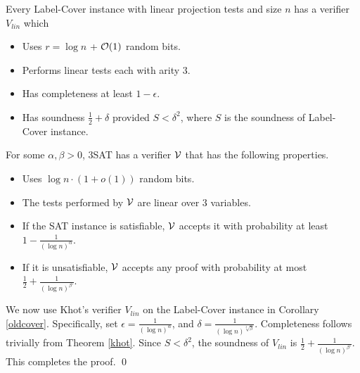 \begin{theorem} \label{khot}
Every {\sc Label-Cover} instance with linear projection tests and size $n$
has a verifier $V_{lin}$ which
\begin{itemize}

\item Uses $r = \log n$ + ${\cal O}(1)$ random bits.

\item Performs linear tests each with arity $3$.

\item Has completeness at least $1 - \epsilon$.

\item Has soundness $\frac{1}{2} + \delta$ provided $ S < \delta^2$,
  where $S$ is the soundness of {\sc Label-Cover} instance.
\end{itemize}
\end{theorem}

\begin{theorem}\label{3lin}
 For some $\alpha, \beta > 0$, {\sc 3SAT} has a verifier ${\cal V}$ that has the following properties.
\begin{itemize}
\item Uses $\log n \cdot \left(1 + o\left(1\right)\right)$ random bits.

\item The tests performed by ${\cal V}$ are linear over $3$ variables. 

\item If the {\sc SAT} instance is satisfiable, ${\cal V}$ accepts it with probability at 
least $1 - \frac{1}{(\log n)^\alpha}$.

\item If it is unsatisfiable, ${\cal V}$ accepts any proof with probability at most $\frac{1}{2} + \frac{1}{(\log n)^{\beta'}}$.
\end{itemize}

\end{theorem}
  We now use Khot's verifier $V_{lin}$ on the
{\sc Label-Cover} instance in Corollary \ref{oldcover}. Specifically,
set $\epsilon = \frac{1}{(\log n)^\alpha}$, and $\delta = \frac{1}{(\log
n)^{\sqrt[3]{\beta}}}$.  Completeness follows trivially from Theorem
\ref{khot}. Since $S < \delta^2$, the soundness of $V_{lin}$ is $\frac{1}{2} +
\frac{1}{(\log n)^{\beta'}}$. This completes the proof. \qed



